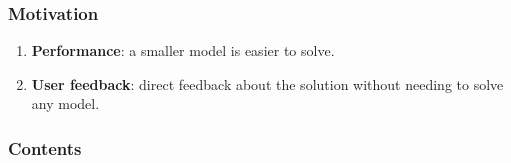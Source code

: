 
\begin{frame}
\frametitle{\textbf{Motivation}}

  \pause
  \begin{enumerate}[<+->]
  \item
    \textbf{Performance}: a smaller model is easier to solve.
  \item
    \textbf{User feedback}: direct feedback about the solution without
    needing to solve any model.
  \end{enumerate}
\end{frame}

\begin{frame}
\frametitle{\textbf{Contents}}
  \begin{block}{\textbf{\secondtitleF}}
  \end{block}  

  \begin{block}{\textbf{\secondtitleS}}
  \end{block}  
\end{frame}


